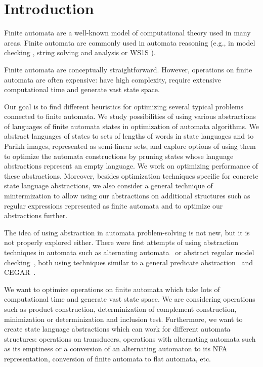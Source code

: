 \chapter{Introduction}

Finite automata are a well-known model of computational theory used in many areas. Finite automata are commonly used in automata reasoning (e.g., in model checking \cite{DBLP:conf/cav/SiegelY20}, string solving and analysis \cite{DBLP:conf/popl/LinB16} or WS1S \cite{DBLP:conf/tacas/FiedorHJLV17, DBLP:journals/acta/FiedorHLV19}).

Finite automata are conceptually straightforward. However, operations on finite automata are often expensive: have high complexity, require extensive computational time and generate vast state space.

Our goal is to find different heuristics for optimizing several typical problems connected to finite automata. We study possibilities of using various abstractions of languages of finite automata states in optimization of automata algorithms. We abstract languages of states to sets of lengths of words in state languages and to Parikh images, represented as semi-linear sets, and explore options of using them to optimize the automata constructions by pruning states whose language abstractions represent an empty language. We work on optimizing performance of these abstractions. Moreover, besides optimization techniques specific for concrete state language abstractions, we also consider a general technique of mintermization to allow using our abstractions on additional structures such as regular expressions represented as finite automata and to optimize our abstractions further.

The idea of using abstraction in automata problem-solving is not new, but it is not properly explored either. There were first attempts of using abstraction techniques in automata such as alternating automata~\cite{GANTY20103444} or abstract regular model checking~\cite{method_model_checking_tool}, both using techniques similar to a general predicate abstraction~\cite{DBLP:conf/cav/ColonU98, DBLP:conf/cav/GrafS97} and CEGAR~\cite{DBLP:conf/cav/ClarkeGJLV00}.

We want to optimize operations on finite automata which take lots of computational time and generate vast state space. We are considering operations such as product construction, determinization of complement construction, minimization or determinization and inclusion test. Furthermore, we want to create state language abstractions which can work for different automata structures: operations on transducers, operations with alternating automata such as its emptiness or a conversion of an alternating automaton to its NFA representation, conversion of finite automata to flat automata, etc.

